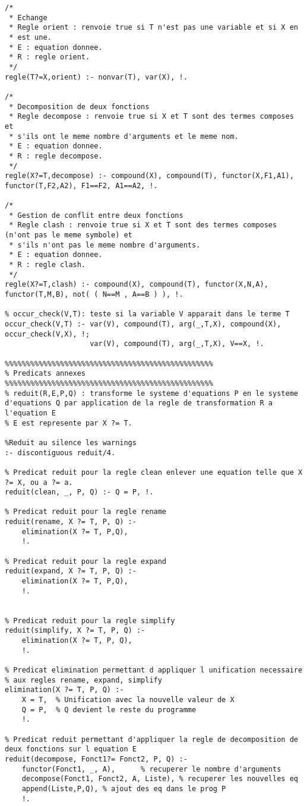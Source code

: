 \documentclass[10pt,a4paper]{report}
\begin{document}
\begin{lstlisting}[caption ={le fichier main.pl}]
/*
 * Echange
 * Regle orient : renvoie true si T n'est pas une variable et si X en
 * est une.
 * E : equation donnee.
 * R : regle orient.
 */
regle(T?=X,orient) :- nonvar(T), var(X), !.

/*
 * Decomposition de deux fonctions
 * Regle decompose : renvoie true si X et T sont des termes composes et
 * s'ils ont le meme nombre d'arguments et le meme nom.
 * E : equation donnee.
 * R : regle decompose.
 */	
regle(X?=T,decompose) :- compound(X), compound(T), functor(X,F1,A1), functor(T,F2,A2), F1==F2, A1==A2, !.

/*
 * Gestion de conflit entre deux fonctions
 * Regle clash : renvoie true si X et T sont des termes composes (n'ont pas le meme symbole) et
 * s'ils n'ont pas le meme nombre d'arguments.
 * E : equation donnee.
 * R : regle clash.
 */
regle(X?=T,clash) :- compound(X), compound(T), functor(X,N,A), functor(T,M,B), not( ( N==M , A==B ) ), !.

% occur_check(V,T): teste si la variable V apparait dans le terme T
occur_check(V,T) :- var(V), compound(T), arg(_,T,X), compound(X), occur_check(V,X), !;
					var(V), compound(T), arg(_,T,X), V==X, !.

%%%%%%%%%%%%%%%%%%%%%%%%%%%%%%%%%%%%%%%%%%%%%%%%%
% Predicats annexes
%%%%%%%%%%%%%%%%%%%%%%%%%%%%%%%%%%%%%%%%%%%%%%%%%
% reduit(R,E,P,Q) : transforme le systeme d'equations P en le systeme d'equations Q par application de la regle de transformation R a l'equation E
% E est represente par X ?= T.

%Reduit au silence les warnings
:- discontiguous reduit/4.

% Predicat reduit pour la regle clean enlever une equation telle que X ?= X, ou a ?= a.
reduit(clean, _, P, Q) :- Q = P, !.

% Predicat reduit pour la regle rename
reduit(rename, X ?= T, P, Q) :-
	elimination(X ?= T, P,Q), 
	!.

% Predicat reduit pour la regle expand
reduit(expand, X ?= T, P, Q) :-
	elimination(X ?= T, P,Q), 
	!.


% Predicat reduit pour la regle simplify
reduit(simplify, X ?= T, P, Q) :-
	elimination(X ?= T, P, Q), 
	!.
	
% Predicat elimination permettant d appliquer l unification necessaire
% aux regles rename, expand, simplify
elimination(X ?= T, P, Q) :-
	X = T,	% Unification avec la nouvelle valeur de X
	Q = P, 	% Q devient le reste du programme
	!.	

% Predicat reduit permettant d'appliquer la regle de decomposition de deux fonctions sur l equation E
reduit(decompose, Fonct1?= Fonct2, P, Q) :-
	functor(Fonct1, _, A),		% recuperer le nombre d'arguments
	decompose(Fonct1, Fonct2, A, Liste), % recuperer les nouvelles eq
	append(Liste,P,Q), % ajout des eq dans le prog P
	!.		


\end{lstlisting}
\end{document}
